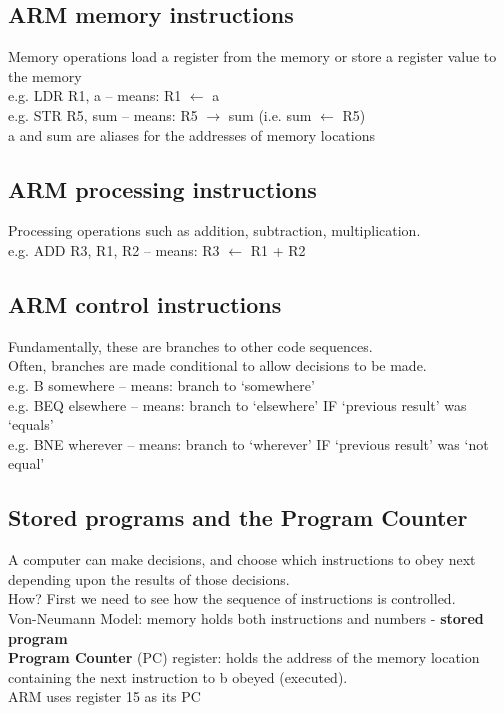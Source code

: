\documentclass{article}
\begin{document}
\subsection{ARM memory instructions}
Memory operations load a register from the memory or store a register value to the memory\\
e.g. LDR R1, a – means: R1 \(\leftarrow\) a\\
e.g. STR R5, sum – means: R5 \(\rightarrow\) sum (i.e. sum \(\leftarrow\) R5)\\
a and sum are aliases for the addresses of memory locations
\subsection{ARM processing instructions}
Processing operations such as addition, subtraction, multiplication.\\
e.g. ADD R3, R1, R2 – means: R3 \(\leftarrow\) R1 + R2
\subsection{ARM control instructions}
Fundamentally, these are branches to other code sequences.\\
Often, branches are made conditional to allow decisions to be made.\\
e.g. B somewhere – means: branch to ‘somewhere’\\
e.g. BEQ elsewhere – means: branch to ‘elsewhere’ IF ‘previous result’ was ‘equals’\\
e.g. BNE wherever – means: branch to ‘wherever’ IF ‘previous result’ was ‘not equal’\\
\subsection{Stored programs and the Program Counter}
A computer can make decisions, and choose which instructions to obey next depending upon the results of those decisions.\\
How? First we need to see how the sequence of instructions is controlled.\\
Von-Neumann Model: memory holds both instructions and numbers - \textbf{stored program}\\
\textbf{Program Counter} (PC) register: holds the address of the memory location containing the next instruction to b obeyed (executed).\\
ARM uses register 15 as its PC
\end{document}
